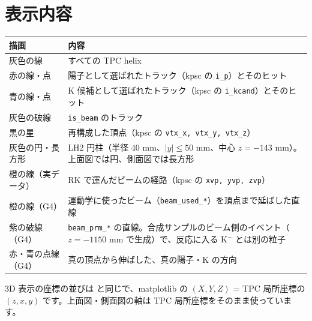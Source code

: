 \documentclass[a4paper,10pt]{ltjsarticle}
\begin{document}
\section{表示内容}
\begin{table}[H]
\centering\small
\begin{tabular}{lp{}}
\toprule
描画 & 内容 \\
\midrule
灰色の線 & すべての TPC helix \\
赤の線・点 & 陽子として選ばれたトラック（kpsc の \texttt{i\_p}）とそのヒット \\
青の線・点 & K 候補として選ばれたトラック（kpsc の \texttt{i\_kcand}）とそのヒット \\
灰色の破線 & \texttt{is\_beam} のトラック \\
黒の星 & 再構成した頂点（kpsc の \texttt{vtx\_x, vtx\_y, vtx\_z}） \\
灰色の円・長方形 & LH2 円柱（半径 40 mm、$|y|\le50$ mm、中心 $z=-143$ mm）。上面図では円、側面図では長方形 \\
橙の線（実データ） & RK で運んだビームの経路（kpsc の \texttt{xvp, yvp, zvp}） \\
橙の線（G4） & 運動学に使ったビーム（\texttt{beam\_used\_*}）を頂点まで延ばした直線 \\
紫の破線（G4） & \texttt{beam\_prm\_*} の直線。合成サンプルのビーム側のイベント（$z=-1150$ mm で生成）で、反応に入る K$^-$ とは別の粒子 \\
赤・青の点線（G4） & 真の頂点から伸ばした、真の陽子・K の方向 \\
\bottomrule
\end{tabular}
\end{table}
3D 表示の座標の並びは  と同じで、matplotlib の $(X, Y, Z)$ = TPC 局所座標の $(z, x, y)$ です。上面図・側面図の軸は TPC 局所座標をそのまま使っています。
\end{document}
